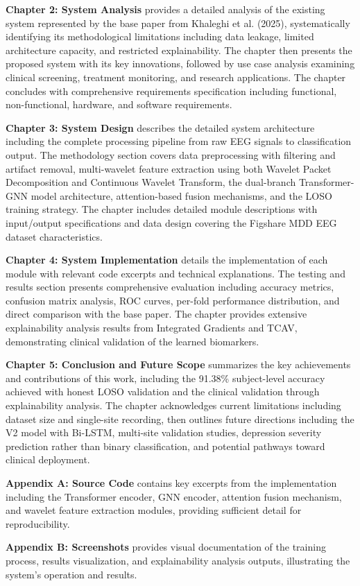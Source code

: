 \textbf{Chapter 2: System Analysis} provides a detailed analysis of the existing system represented by the base paper from Khaleghi et al. (2025), systematically identifying its methodological limitations including data leakage, limited architecture capacity, and restricted explainability. The chapter then presents the proposed system with its key innovations, followed by use case analysis examining clinical screening, treatment monitoring, and research applications. The chapter concludes with comprehensive requirements specification including functional, non-functional, hardware, and software requirements.

\textbf{Chapter 3: System Design} describes the detailed system architecture including the complete processing pipeline from raw EEG signals to classification output. The methodology section covers data preprocessing with filtering and artifact removal, multi-wavelet feature extraction using both Wavelet Packet Decomposition and Continuous Wavelet Transform, the dual-branch Transformer-GNN model architecture, attention-based fusion mechanisms, and the LOSO training strategy. The chapter includes detailed module descriptions with input/output specifications and data design covering the Figshare MDD EEG dataset characteristics.

\textbf{Chapter 4: System Implementation} details the implementation of each module with relevant code excerpts and technical explanations. The testing and results section presents comprehensive evaluation including accuracy metrics, confusion matrix analysis, ROC curves, per-fold performance distribution, and direct comparison with the base paper. The chapter provides extensive explainability analysis results from Integrated Gradients and TCAV, demonstrating clinical validation of the learned biomarkers.

\textbf{Chapter 5: Conclusion and Future Scope} summarizes the key achievements and contributions of this work, including the 91.38\% subject-level accuracy achieved with honest LOSO validation and the clinical validation through explainability analysis. The chapter acknowledges current limitations including dataset size and single-site recording, then outlines future directions including the V2 model with Bi-LSTM, multi-site validation studies, depression severity prediction rather than binary classification, and potential pathways toward clinical deployment.

\textbf{Appendix A: Source Code} contains key excerpts from the implementation including the Transformer encoder, GNN encoder, attention fusion mechanism, and wavelet feature extraction modules, providing sufficient detail for reproducibility.

\textbf{Appendix B: Screenshots} provides visual documentation of the training process, results visualization, and explainability analysis outputs, illustrating the system's operation and results.

